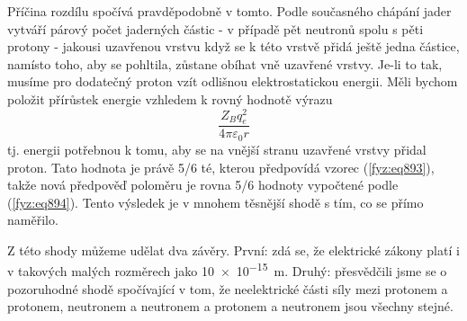     Příčina rozdílu spočívá pravděpodobně v tomto. Podle současného chápání jader vytváří párový
    počet jaderných částic - v případě  pět neutronů spolu s pěti protony - jakousi
    uzavřenou vrstvu když se k této vrstvě přidá ještě jedna částice, namísto toho, aby se pohltila,
    zůstane obíhat vně uzavřené vrstvy. Je-li to tak, musíme pro dodatečný proton vzít odlišnou
    elektrostatickou energii. Měli bychom položit přírůstek energie  vzhledem k 
    rovný hodnotě výrazu
    \begin{equation*}
      \dfrac{Z_Bq^2_e}{4π\varepsilon_0r}
    \end{equation*}
    tj. energii potřebnou k tomu, aby se na vnější stranu uzavřené vrstvy přidal proton. Tato
    hodnota je právě 5/6 té, kterou předpovídá vzorec (\ref{fyz:eq893}), takže nová předpověď
    poloměru je rovna 5/6 hodnoty vypočtené podle (\ref{fyz:eq894}). Tento výsledek je v mnohem
    těsnější shodě s tím, co se přímo naměřilo.

    Z této shody můžeme udělat dva závěry. První: zdá se, že elektrické zákony platí i v takových
    malých rozměrech jako \SI{10e-15}{\m}. Druhý: přesvědčili jsme se o pozoruhodné shodě
    spočívající v tom, že neelektrické části síly mezi protonem a protonem, neutronem a neutronem a
    protonem a neutronem jsou všechny stejné.
    

